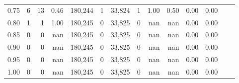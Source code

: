 \begin{tabular}{rrrrrrrrrrrrrr}
0.75 &       6 &      13 &    0.46 &  180,244 &        1 &  33,824 &       1 &  1.00 &  0.50 &  0.00 &      0.00 \\
0.80 &       1 &       1 &    1.00 &  180,245 &        0 &  33,825 &       0 &   nan &   nan &  0.00 &      0.00 \\
0.85 &       0 &       0 &     nan &  180,245 &        0 &  33,825 &       0 &   nan &   nan &  0.00 &      0.00 \\
0.90 &       0 &       0 &     nan &  180,245 &        0 &  33,825 &       0 &   nan &   nan &  0.00 &      0.00 \\
0.95 &       0 &       0 &     nan &  180,245 &        0 &  33,825 &       0 &   nan &   nan &  0.00 &      0.00 \\
1.00 &       0 &       0 &     nan &  180,245 &        0 &  33,825 &       0 &   nan &   nan &  0.00 &      0.00 \\
\bottomrule
\end{tabular}

